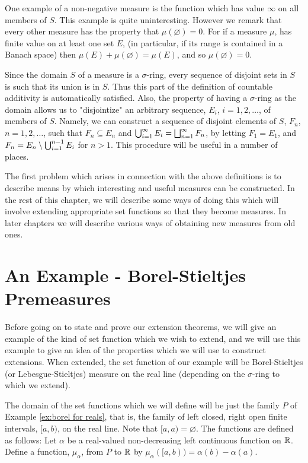 One example of a non-negative measure is the function which has value $\infty$ on all members of $S$. This example is quite uninteresting. However we remark that every other measure has the property that $\mu(\varnothing)=0$. For if a measure $\mu$, has finite value on at least one set $E$, (in particular, if its range is contained in a Banach space) then $\mu(E)+\mu(\varnothing)=\mu(E)$, and so $\mu(\varnothing)=0$.

Since the domain $S$ of a measure is a $\sigma$-ring, every sequence of disjoint sets in $S$ is such that its union is in $S$. Thus this part of the definition of countable additivity is automatically satisfied. Also, the property of having a $\sigma$-ring as the domain allows us to "disjointize" an arbitrary sequence, $E_i$, $i = 1, 2,\dots$, of members of $S$. Namely, we can construct a sequence of disjoint elements of $S$, $F_n$, $n = 1, 2,\dots$, such that $F_n\subseteq E_n$ and $\bigcup_{i=1}^\infty E_i=\bigsqcup_{n=1}^\infty F_n$, by letting $F_1 = E_1$, and $F_n=E_n\setminus\bigcup_{i=1}^{n-1}E_i$ for $n > 1$. This procedure will be useful in a number of places.

The first problem which arises in connection with the above definitions is to describe means by which interesting and useful measures can be constructed. In the rest of this chapter, we will describe some ways of doing this which will involve extending appropriate set functions so that they become measures. In later chapters we will describe various ways of obtaining new measures from old ones.


\section{An Example - Borel-Stieltjes Premeasures}

Before going on to state and prove our extension theorems, we will give an example of the kind of set function which we wish to extend, and we will use this example to give an idea of the properties which we will use to construct extensions. When extended, the set function of our example will be Borel-Stieltjes (or Lebesgue-Stieltjes) measure on the real line (depending on the $\sigma$-ring to which we extend).

\begin{definition}
\label{def:stieltjes premeasure}
The domain of the set functions which we will define will be just the family $P$ of Example \ref{ex:borel for reals}, that is, the family of left closed, right open finite intervals, $[a, b)$, on the real line. Note that $[a, a)=\varnothing $. The functions are defined as follows: Let $\alpha$ be a real-valued non-decreasing left continuous function on $\mathbb{R}$. Define a function, $\mu_\alpha$, from $P$ to $\mathbb{R}$ by $\mu_\alpha([a, b))=\alpha(b)-\alpha(a)$.
\end{definition}

